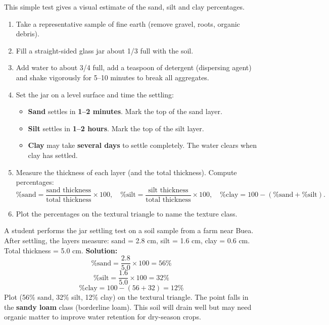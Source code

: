 \documentclass[11pt]{article}
\begin{document}
\begin{methode}
This simple test gives a visual estimate of the sand, silt and clay percentages.
\begin{enumerate}
\item Take a representative sample of fine earth (remove gravel, roots, organic debris).
\item Fill a straight-sided glass jar about 1/3 full with the soil.
\item Add water to about 3/4 full, add a teaspoon of detergent (dispersing agent) and shake vigorously for 5–10 minutes to break all aggregates.
\item Set the jar on a level surface and time the settling:
\begin{itemize}
\item \textbf{Sand} settles in \textbf{1–2 minutes}. Mark the top of the sand layer.
\item \textbf{Silt} settles in \textbf{1–2 hours}. Mark the top of the silt layer.
\item \textbf{Clay} may take \textbf{several days} to settle completely. The water clears when clay has settled.
\end{itemize}
\item Measure the thickness of each layer (and the total thickness). Compute percentages:
\[
\% \text{sand} = \frac{\text{sand thickness}}{\text{total thickness}} \times 100,\quad
\% \text{silt} = \frac{\text{silt thickness}}{\text{total thickness}} \times 100,\quad
\% \text{clay} = 100 - (\% \text{sand} + \% \text{silt}).
\]
\item Plot the percentages on the textural triangle to name the texture class.
\end{enumerate}
\end{methode}

\begin{exoresolu}
A student performs the jar settling test on a soil sample from a farm near Buea. After settling, the layers measure: sand = 2.8 cm, silt = 1.6 cm, clay = 0.6 cm. Total thickness = 5.0 cm.
\tcblower
\textbf{Solution:}
\[
\% \text{sand} = \frac{2.8}{5.0} \times 100 = 56\%
\]
\[
\% \text{silt} = \frac{1.6}{5.0} \times 100 = 32\%
\]
\[
\% \text{clay} = 100 - (56 + 32) = 12\%
\]
Plot (56\% sand, 32\% silt, 12\% clay) on the textural triangle. The point falls in the \textbf{sandy loam} class (borderline loam). This soil will drain well but may need organic matter to improve water retention for dry-season crops.

\end{exoresolu}
\end{document}
